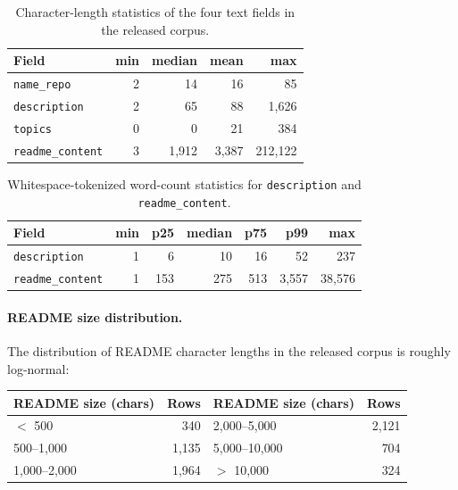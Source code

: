 \documentclass{article}
\begin{document}
\begin{table}[ht]
\centering
\caption{Character-length statistics of the four text fields in the
released corpus.}
\label{tab:text-stats-chars}
\small
\begin{tabular}{lrrrr}
\toprule
Field & min & median & mean & max \\
\midrule
\texttt{name\_repo} & 2 & 14 & 16 & 85 \\
\texttt{description} & 2 & 65 & 88 & 1{,}626 \\
\texttt{topics} & 0 & 0 & 21 & 384 \\
\texttt{readme\_content} & 3 & 1{,}912 & 3{,}387 & 212{,}122 \\
\bottomrule
\end{tabular}
\end{table}

\begin{table}[ht]
\centering
\caption{Whitespace-tokenized word-count statistics for
\texttt{description} and \texttt{readme\_content}.}
\label{tab:text-stats-words}
\small
\begin{tabular}{lrrrrrr}
\toprule
Field & min & p25 & median & p75 & p99 & max \\
\midrule
\texttt{description} & 1 & 6 & 10 & 16 & 52 & 237 \\
\texttt{readme\_content} & 1 & 153 & 275 & 513 & 3{,}557 & 38{,}576 \\
\bottomrule
\end{tabular}
\end{table}

\paragraph{README size distribution.}
The distribution of README character lengths in the released corpus
is roughly log-normal:

\begin{center}
\small
\begin{tabular}{lrlr}
\toprule
README size (chars) & Rows & README size (chars) & Rows \\
\midrule
$<$ 500 & 340 & 2{,}000--5{,}000 & 2{,}121 \\
500--1{,}000 & 1{,}135 & 5{,}000--10{,}000 & 704 \\
1{,}000--2{,}000 & 1{,}964 & $>$ 10{,}000 & 324 \\
\bottomrule
\end{tabular}
\end{center}
\end{document}
